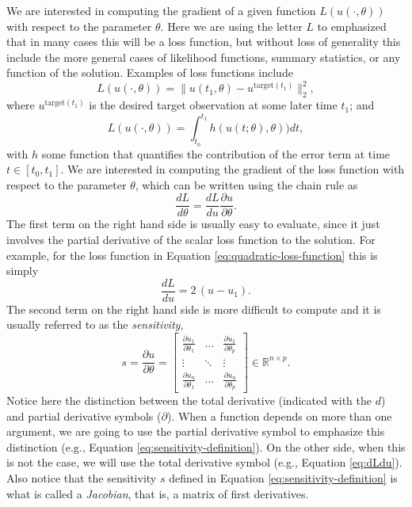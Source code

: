 We are interested in computing the gradient of a given function $L(u(\cdot, \theta))$ with respect to the parameter $\theta$.
Here we are using the letter $L$ to emphasized that in many cases this will be a loss function, but without loss of generality this include the more general cases of likelihood functions, summary statistics, or any function of the solution. 
Examples of loss functions include
\begin{equation}
 L(u(\cdot, \theta)) = \| u(t_1, \theta) - u^{\text{target}(t_1)} \|_2^2,
 \label{eq:quadratic-loss-function}
\end{equation}
where $u^{\text{target}(t_1)}$ is the desired target observation at some later time $t_1$; and
\begin{equation}
 L(u(\cdot, \theta)) = \int_{t_0}^{t_1} h( u(t;\theta), \theta) ) dt, 
\end{equation}
with $h$ some function that quantifies the contribution of the error term at time $t \in [t_0, t_1]$.
We are interested in computing the gradient of the loss function with respect to the parameter $\theta$, which can be written using the chain rule as
\begin{equation}
 \frac{dL}{d\theta} = \frac{dL}{du} \frac{\partial u}{\partial \theta}.
 \label{eq:dLdtheta_VJP}
\end{equation} 
The first term on the right hand side is usually easy to evaluate, since it just involves the partial derivative of the scalar loss function to the solution.
For example, for the loss function in Equation \eqref{eq:quadratic-loss-function} this is simply
\begin{equation}
    \frac{dL}{du} = 2 \, (u - u_1).
    \label{eq:dLdu}
\end{equation}
The second term on the right hand side is more difficult to compute and it is usually referred to as the \textit{sensitivity},
\begin{equation}
 s 
 = 
 \frac{\partial u}{\partial \theta} 
 =
 \begin{bmatrix}
   \frac{\partial u_1}{\partial \theta_1} & \dots & \frac{\partial u_1}{\partial \theta_p} \\
   \vdots & \ddots & \vdots \\
   \frac{\partial u_n}{\partial \theta_1} & \dots & \frac{\partial u_n}{\partial \theta_p}
 \end{bmatrix}
 \in \mathbb R^{n \times p}.
 \label{eq:sensitivity-definition}
\end{equation}
Notice here the distinction between the total derivative (indicated with the $d$) and partial derivative symbols ($\partial$). 
When a function depends on more than one argument, we are going to use the partial derivative symbol to emphasize this distinction (e.g., Equation \eqref{eq:sensitivity-definition}). 
On the other side, when this is not the case, we will use the total derivative symbol (e.g., Equation \eqref{eq:dLdu}).
Also notice that the sensitivity $s$ defined in Equation \eqref{eq:sensitivity-definition} is what is called a \textit{Jacobian}, that is, a matrix of first derivatives.

